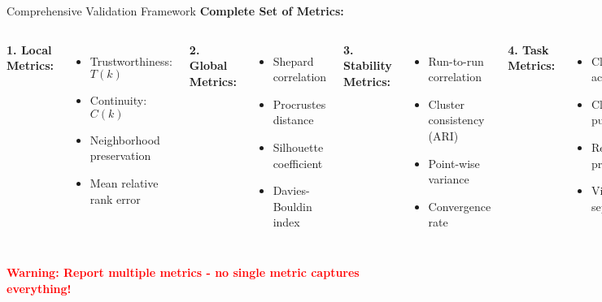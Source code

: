 \documentclass[aspectratio=169]{beamer}
\newcommand{\conceptbox}[2]{\colorbox{#1!20}{\textcolor{#1}{\textbf{#2}}}}
\newcommand{\warning}[1]{\conceptbox{red}{Warning: #1}}
\begin{document}
\begin{frame}{Comprehensive Validation Framework}
\textbf{Complete Set of Metrics:}

\begin{columns}
\textbf{1. Local Metrics:}
\begin{itemize}
\item Trustworthiness: $T(k)$
\item Continuity: $C(k)$
\item Neighborhood preservation
\item Mean relative rank error
\end{itemize}

\textbf{2. Global Metrics:}
\begin{itemize}
\item Shepard correlation
\item Procrustes distance
\item Silhouette coefficient
\item Davies-Bouldin index
\end{itemize}

\textbf{3. Stability Metrics:}
\begin{itemize}
\item Run-to-run correlation
\item Cluster consistency (ARI)
\item Point-wise variance
\item Convergence rate
\end{itemize}

\textbf{4. Task Metrics:}
\begin{itemize}
\item Classification accuracy
\item Clustering purity
\item Retrieval precision
\item Visual separability
\end{itemize}
\end{columns}

\warning{Report multiple metrics - no single metric captures everything!}
\end{frame}
\end{document}
